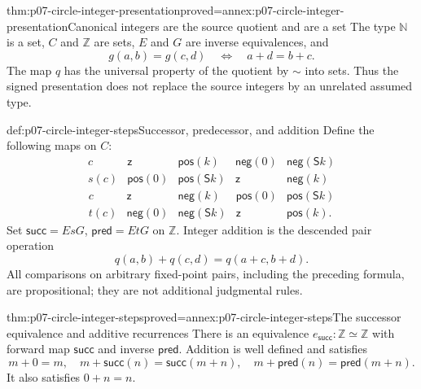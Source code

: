 \begin{hblemma}{thm:p07-circle-integer-presentation}{proved=annex:p07-circle-integer-presentation}{Canonical integers are the source quotient and are a set}
The type \(\mathbb N\) is a set, \(C\) and \(\mathbb Z\) are sets,
\(E\) and \(G\) are inverse equivalences, and
\[
g(a,b)=g(c,d)\quad\Longleftrightarrow\quad a+d=b+c.
\]
The map \(q\) has the universal property of the quotient by \(\sim\) into
sets. Thus the signed presentation does not replace the source integers by
an unrelated assumed type.
\end{hblemma}

\begin{hbdefinition}{def:p07-circle-integer-steps}{Successor, predecessor, and addition}
Define the following maps on \(C\):
\[
\begin{array}{c|cccc}
c&\mathsf z&\mathsf{pos}(k)&\mathsf{neg}(0)&\mathsf{neg}(\mathsf Sk)\\ \hline
s(c)&\mathsf{pos}(0)&\mathsf{pos}(\mathsf Sk)&\mathsf z&\mathsf{neg}(k)
\end{array}
\]
\[
\begin{array}{c|cccc}
c&\mathsf z&\mathsf{neg}(k)&\mathsf{pos}(0)&\mathsf{pos}(\mathsf Sk)\\ \hline
t(c)&\mathsf{neg}(0)&\mathsf{neg}(\mathsf Sk)&\mathsf z&\mathsf{pos}(k).
\end{array}
\]
Set \(\mathsf{succ}=EsG\), \(\mathsf{pred}=EtG\) on \(\mathbb Z\).
Integer addition is the descended pair operation
\[
q(a,b)+q(c,d)=q(a+c,b+d).
\]
All comparisons on arbitrary fixed-point pairs, including the preceding
formula, are propositional; they are not additional judgmental rules.
\end{hbdefinition}

\begin{hblemma}{thm:p07-circle-integer-steps}{proved=annex:p07-circle-integer-steps}{The successor equivalence and additive recurrences}
There is an equivalence \(e_{\mathsf{succ}}:\mathbb Z\simeq\mathbb Z\)
with forward map \(\mathsf{succ}\) and inverse \(\mathsf{pred}\).
Addition is well defined and satisfies
\[
m+0=m,\quad m+\mathsf{succ}(n)=\mathsf{succ}(m+n),\quad
m+\mathsf{pred}(n)=\mathsf{pred}(m+n).
\]
It also satisfies \(0+n=n\).
\end{hblemma}

